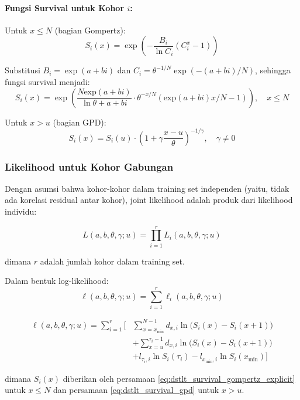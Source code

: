 \paragraph{Fungsi Survival untuk Kohor $i$:}

Untuk $x \leq N$ (bagian Gompertz):
\begin{equation}
S_i(x) = \exp\left(-\frac{B_i}{\ln C_i}(C_i^x - 1)\right)
\label{eq:dstlt_survival_gompertz}
\end{equation}

Substitusi $B_i = \exp(a + bi)$ dan $C_i = \theta^{-1/N} \exp(-(a+bi)/N)$, sehingga fungsi survival menjadi:
\begin{equation}
S_i(x) = \exp\left(\frac{N \text{exp}(a+bi)}{\ln\theta +a+bi} \cdot \theta^{-x/N}(\text{exp}(a+bi) x/N - 1)\right), \quad x \leq N
\label{eq:dstlt_survival_gompertz_explicit}
\end{equation}

Untuk $x > u$ (bagian GPD):
\begin{equation}
S_i(x) = S_i(u) \cdot \left(1 + \gamma\frac{x-u}{\theta}\right)^{-1/\gamma}, \quad \gamma \neq 0
\label{eq:dstlt_survival_gpd}
\end{equation}

\subsubsection{Likelihood untuk Kohor Gabungan}

Dengan asumsi bahwa kohor-kohor dalam training set independen (yaitu, tidak ada korelasi residual antar kohor), joint likelihood adalah produk dari likelihood individu:

\begin{equation}
L(a, b, \theta, \gamma; u) = \prod_{i=1}^{r} L_i(a, b, \theta, \gamma; u)
\label{eq:dstlt_joint_likelihood}
\end{equation}

dimana $r$ adalah jumlah kohor dalam training set.

Dalam bentuk log-likelihood:
\begin{equation}
\ell(a, b, \theta, \gamma; u) = \sum_{i=1}^{r} \ell_i(a, b, \theta, \gamma; u)
\label{eq:dstlt_joint_loglikelihood}
\end{equation}

\begin{align}
\ell(a, b, \theta, \gamma; u) = \sum_{i=1}^{r} \Bigg[ &\sum_{x=x_{\min}}^{N-1} d_{x,i} \ln\big(S_i(x) - S_i(x+1)\big) \nonumber \\
&+ \sum_{x=u}^{\tau_i-1} d_{x,i} \ln\big(S_i(x) - S_i(x+1)\big) \nonumber \\
&+ l_{\tau_i,i} \ln S_i(\tau_i) - l_{x_{\min},i} \ln S_i(x_{\min}) \Bigg]
\label{eq:dstlt_loglik_expanded}
\end{align}

dimana $S_i(x)$ diberikan oleh persamaan \eqref{eq:dstlt_survival_gompertz_explicit} untuk $x \leq N$ dan persamaan \eqref{eq:dstlt_survival_gpd} untuk $x > u$.

